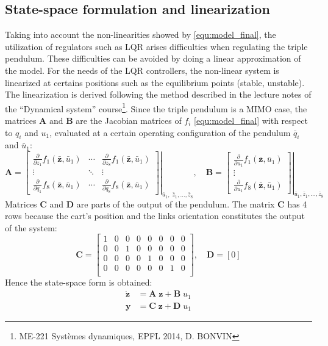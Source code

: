 \documentclass[a4paper,12pt]{article}
\begin{document}
\subsection{State-space formulation and linearization}
Taking into account the non-linearities showed by \eqref{equ:model_final}, the utilization of regulators such as LQR arises difficulties when regulating the triple pendulum. These difficulties can be avoided by doing a linear approximation of the model. For the needs of the LQR controllers, the non-linear system is linearized at certains positions such as the equilibrium points (stable, unstable). The linearization is derived following the method described in the lecture notes of the ``Dynamical system'' course\footnote{ME-221 Systèmes dynamiques, EPFL 2014, D. BONVIN}. Since the triple pendulum is a MIMO case, the matrices $\mathbf{A}\text{ and }\mathbf{B}$ are the Jacobian matrices of $f_i$ \eqref{equ:model_final} with respect to $q_i$ and $u_1$, evaluated at a certain operating configuration of the pendulum $\bar q_i$ and $\bar u_1$:
\[
\mathbf{A} = {\left. {\left[ 
{\begin{array}{*{20}{c}}
\frac{\partial}{\partial {z_1}} f_1(\bar{\mathbf{z}},\bar u_1) & \cdots &\frac{\partial}{\partial {z_8}} f_1(\bar{\mathbf{z}},\bar u_1)\\
 \vdots & \ddots & \vdots \\
\frac{\partial}{\partial {q_1}}f_8(\bar{\mathbf{z}},\bar u_1) & \cdots &\frac{\partial}{\partial {q_8}}f_8(\bar{\mathbf{z}},\bar u_1)
\end{array}}
\right]}
\right|_{\bar u_1,\;\bar z_1,\ldots,\bar z_8}},\quad
\mathbf{B} = {\left. {\left[ {\begin{array}{*{20}{c}}
\frac{\partial}{\partial {u_1}}f_1(\bar{\mathbf{z}},\bar u_1)\\
 \vdots \\
\frac{\partial}{\partial {u_1}}f_8(\bar{\mathbf{z}},\bar u_1)
\end{array}} \right]} \right|_{\bar u_1, \bar z_1,\ldots,\bar z_8}}
\]
Matrices $\mathbf{C}$ and $\mathbf{D}$ are parts of the output of the pendulum. The matrix $\mathbf{C}$ has 4 rows because the cart's position and the links orientation constitutes the output of the system:
\[
\mathbf{C} = 
\begin{bmatrix}
1 & 0 & 0 & 0 & 0 & 0 & 0 & 0 \\
0 & 0 & 1 & 0 & 0 & 0 & 0 & 0 \\
0 & 0 & 0 & 0 & 1 & 0 & 0 & 0 \\
0 & 0 & 0 & 0 & 0 & 0 & 1 & 0 \\
\end{bmatrix}, \quad
\mathbf{D} = [0]
\]
Hence the state-space form is obtained:
\begin{equation} 
	\begin{split}
	\dot{\mathbf{z}} &= \mathbf{A}\; \mathbf{z} + \mathbf{B}\; u_1 \\
	\mathbf{y} &= \mathbf{C}\; \mathbf{z} + \mathbf{D}\; u_1
	\end{split}
\end{equation}
\end{document}
